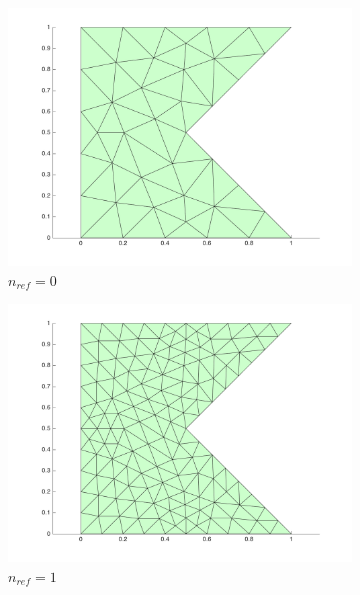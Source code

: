 \documentclass[10pt]{article}
\begin{document}
\begin{figure}[H]
        \centering
        \begin{subfigure}[b]{0.35\textwidth}
                \centering
                \includegraphics[width=\textwidth]{refine0.png}
                \caption{\(n_{ref}=0\)}
        \end{subfigure}%
        \begin{subfigure}[b]{0.35\textwidth}
                \centering
                \includegraphics[width=\textwidth]{refine1.png}
                \caption{\(n_{ref}=1\)}
        \end{subfigure}%
        \begin{subfigure}[b]{0.35\textwidth}
                \centering

\end{subfigure}
\end{figure}
\end{document}
